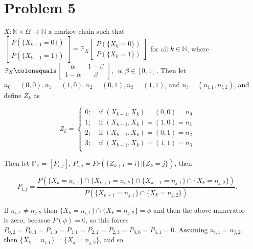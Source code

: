 \documentclass[12pt]{article}
\newcommand{\nats}[0] { \mathbb{N}}
\newcommand{\Om}[0] { \Omega }
\newcommand{\IF}[0] { \; \textrm{if} \; }
\newcommand{\rarw}[0] { \rightarrow }
\newcommand{ \defeq }[0] { \colonequals }
\newcommand{ \cf }[1] { \mathbf{1}_{#1} }
\begin{document}




\section*{Problem 5}




$X: \nats \times \Om \rarw \nats$ a markov chain such that $ \left[ \begin{array}{c} P( \{ X_{k+1} = 0 \} ) \\ P( \{ X_{k+1} =1 \} ) \end{array} \right]  = \mathbb{P}_X \left[ \begin{array}{c} P( \{ X_{k} = 0 \} ) \\ P( \{ X_{k} =1 \} ) \end{array} \right] $ for all $k \in \nats$, where $ \mathbb{P}_X \defeq \left[ \begin{array}{cc} \alpha & 1-\beta \\ 1-\alpha & \beta \end{array} \right]$, $ \; \alpha, \beta \in [0,1]$. Then let $n_0 = (0,0), n_1= (1,0), n_2 = (0,1), n_3 = (1,1)$, and $n_i = (n_{i,1}, n_{i,2})$, and define $Z_k$ as


$$
 Z_k = \left \{ \begin{array}{c}   
 0; \; \; \; \IF  (X_{k-1}, X_k) = (0,0) = n_0  \\   
 1; \; \; \; \IF  (X_{k-1}, X_k) = (1,0) = n_1  \\ 
 2; \; \; \; \IF  (X_{k-1}, X_k) = (0,1) = n_2  \\ 
 3; \; \; \; \IF  (X_{k-1}, X_k) = (1,1) = n_3  \\     \end{array} \right.
$$

\noindent
Then let $\mathbb{P}_Z = [ P_{i,j} ]$, $P_{i,j} = Pr( \{ Z_{k+1} = i \} | \{ Z_{k} = j  \} )$, then

$$
P_{i,j} =  \frac{ P( \{ X_k = n_{i,1} \} \cap \{ X_{k+1} = n_{i,2} \} \cap \{ X_{k-1} = n_{j,1} \} \cap \{ X_k = n_{j,2} \}  ) }{ P( \{ X_{k-1} = n_{j,1} \} \cap \{ X_k = n_{j,2} \}  ) }.
$$

If $n_{i,1} \not = n_{j,2}$ then $\{ X_k = n_{i,1} \} \cap \{ X_k = n_{j,2} \} = \phi $ and then the above numerator is zero, becasue $P(\phi) = 0$, so this forces 
$P_{0,2} = P_{0,3} = P_{1,0} = P_{1,1} = P_{2,2} = P_{2,3} = P_{3,0} = P_{3,1} = 0$. Assuming $n_{i,1} = n_{j,2}$, then  $\{ X_k = n_{i,1} \} = \{ X_k = n_{j,2} \} $, and so
\end{document}
